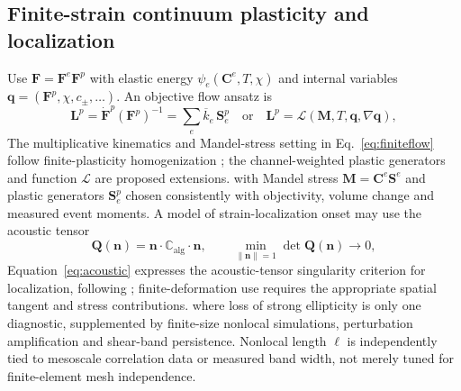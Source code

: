 \documentclass[11pt,a4paper]{article}
\begin{document}
\subsection{Finite-strain continuum plasticity and localization}
Use $\mathbf F=\mathbf F^e\mathbf F^p$ with elastic energy $\psi_e(\mathbf C^e,T,\chi)$ and internal variables $\mathbf q=(\mathbf F^p,\chi,c_\pm,\ldots)$. An objective flow ansatz is
\begin{equation}
 \mathbf L^p=\dot{\mathbf F}^p(\mathbf F^p)^{-1}
 =\sum_{e}\overline k_e\,\mathbf S_e^p\quad\text{or}\quad
 \mathbf L^p=\mathcal L(\mathbf M,T,\mathbf q,\nabla\mathbf q),\label{eq:finiteflow}
\end{equation}
The multiplicative kinematics and Mandel-stress setting in Eq.~\eqref{eq:finiteflow} follow finite-plasticity homogenization \cite{miehe1999}; the channel-weighted plastic generators and function $\mathcal L$ are proposed extensions.
with Mandel stress $\mathbf M=\mathbf C^e\mathbf S^e$ and plastic generators $\mathbf S_e^p$ chosen consistently with objectivity, volume change and measured event moments. A model of strain-localization onset may use the acoustic tensor
\begin{equation}
 \mathbf Q(\mathbf n)=\mathbf n\cdot\mathbb C_{\mathrm{alg}}\cdot\mathbf n,
 \qquad\min_{\|\mathbf n\|=1}\det\mathbf Q(\mathbf n)\to0,\label{eq:acoustic}
\end{equation}
Equation~\eqref{eq:acoustic} expresses the acoustic-tensor singularity criterion for localization, following \cite{rudnicki1975}; finite-deformation use requires the appropriate spatial tangent and stress contributions.
where loss of strong ellipticity is only one diagnostic, supplemented by finite-size nonlocal simulations, perturbation amplification and shear-band persistence. Nonlocal length $\ell$ is independently tied to mesoscale correlation data or measured band width, not merely tuned for finite-element mesh independence.
\end{document}
